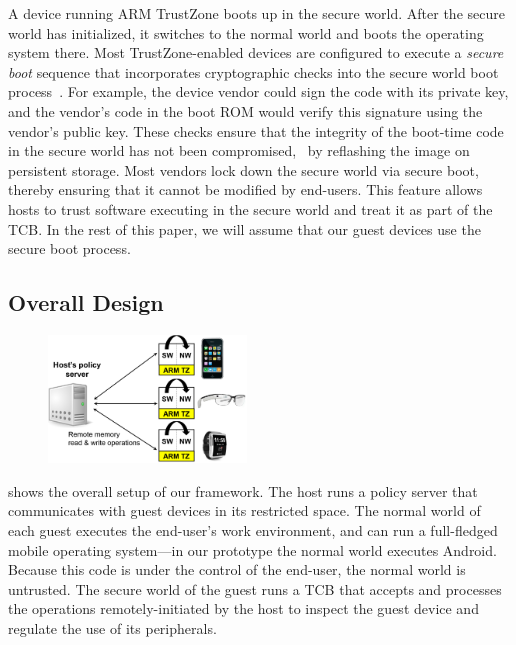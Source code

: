 A device running ARM TrustZone boots up in the secure world. After the secure
world has initialized, it switches to the normal world and boots the operating
system there. Most TrustZone-enabled devices are configured to execute a
\textit{secure boot} sequence that incorporates cryptographic checks into the
secure world boot process~\cite{armtz}. For example, the device vendor could
sign the code with its private key, and the vendor's code in the boot ROM would
verify this signature using the vendor's public key. These checks ensure that
the integrity of the boot-time code in the secure world has not been
compromised, \eg~by reflashing the image on persistent storage. Most vendors
lock down the secure world via secure boot, thereby ensuring that it cannot be
modified by end-users. This feature allows hosts to trust software executing in
the secure world and treat it as part of the TCB. In the rest of this paper, we
will assume that our guest devices use the secure boot process.

\subsection{Overall Design}
\label{section:mechanism:overall}

\begin{figure}[t!]
\centering
\includegraphics[keepaspectratio=true,width=0.47\textwidth]{figures/host-guest.png}
{\label{figure:hostguest}}
\end{figure}

 shows the overall setup of our framework. The host
runs a policy server that communicates with guest devices in its restricted
space. The normal world of each guest executes the end-user's work environment,
and can run a full-fledged mobile operating system---in our prototype the
normal world executes Android. Because this code is under the control of the
end-user, the normal world is untrusted. The secure world of the guest runs a
TCB that accepts and processes the operations remotely-initiated by the host to
inspect the guest device and regulate the use of its peripherals. 

